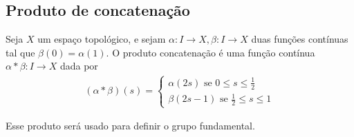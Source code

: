 \subsection{Produto de concatenação}
\label{Produto-grupo-fundamental-def}
\begin{defi}
	Seja $X$ um espaço topológico, e sejam $\alpha:I\rightarrow X, \beta:I\rightarrow X$ duas funções contínuas tal que $\beta(0)=\alpha(1).$ O produto concatenação é uma função contínua $\alpha*\beta:I\rightarrow X$ dada por 
 \begin{align*}
     (\alpha*\beta)(s)=\begin{cases}
         \alpha(2s)\mbox{ se }0\le s\le\frac{1}{2}\\
         \beta(2s-1)\mbox{ se }\frac{1}{2}\le s \le 1
     \end{cases}
 \end{align*}
\end{defi}

Esse produto será usado para definir o grupo fundamental.


